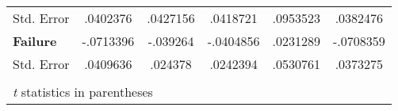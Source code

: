\documentclass[11pt]{article}
\begin{document}
\begin{landscape}
\begin{table}[h]
\begin{tabular}{l*{5}{c}}
	Std. Error   &    .0402376&    .0427156&    .0418721&    .0953523&    .0382476\\
	\textbf{Failure}     &   -.0713396&    -.039264&   -.0404856&    .0231289&   -.0708359\\
	Std. Error   &    .0409636&     .024378&    .0242394&    .0530761&    .0373275\\
	\hline \\[-1.8ex] 
	\multicolumn{6}{l}{\footnotesize \textit{t} statistics in parentheses}\\
	\hline\hline
\end{tabular}
\end{table}

\end{landscape}
\end{document}
